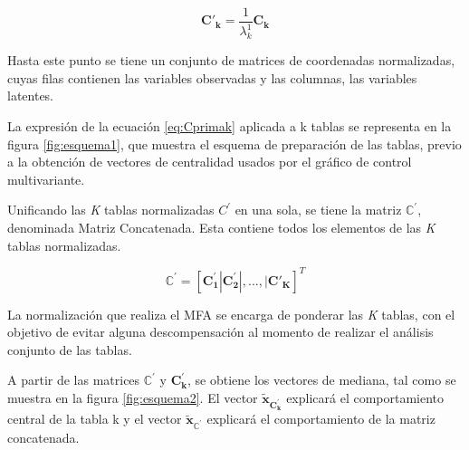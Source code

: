 \documentclass[mathematics,article,submit,moreauthors,pdftex]{mdpi}
\begin{document}
\begin{equation}
\mathbf{C'_k}=\frac{1}{\lambda_{k}^1} \mathbf{C_k}
\label{eq:Cprimak}
\end{equation}

Hasta este punto se tiene un conjunto de matrices de coordenadas
normalizadas, cuyas filas contienen las variables observadas y las
columnas, las variables latentes.

La expresión de la ecuación \ref{eq:Cprimak} aplicada a k tablas se
representa en la figura \ref{fig:esquema1}, que muestra el esquema de
preparación de las tablas, previo a la obtención de vectores de
centralidad usados por el gráfico de control multivariante.

Unificando las \emph{K} tablas normalizadas \(C^{'}\) en una sola, se
tiene la matriz \(\mathbb{C}^{'}\), denominada Matriz Concatenada. Esta
contiene todos los elementos de las \emph{K} tablas normalizadas.

\begin{equation}
\mathbf{\mathbb{C^{'}}}=[\mathbf{C_1^{'}}|\mathbf{C_2^{'}}|,...,|\mathbf{C'_{K}}]^{T}
\label{eq:Cprima}
\end{equation}

La normalización que realiza el MFA se encarga de ponderar las \emph{K}
tablas, con el objetivo de evitar alguna descompensación al momento de
realizar el análisis conjunto de las tablas.

A partir de las matrices \(\mathbf{\mathbb{C^{'}}}\) y
\(\mathbf{C_k^{'}}\), se obtiene los vectores de mediana, tal como se
muestra en la figura \ref{fig:esquema2}. El vector
\(\mathbf{\tilde{x}_{C_k^{'}}}\) explicará el comportamiento central de
la tabla k y el vector \(\mathbf{\tilde{x}_{\mathbb{C^{'}}}}\) explicará
el comportamiento de la matriz concatenada.
\end{document}
